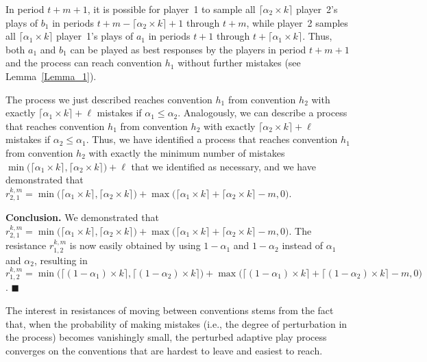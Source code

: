 \documentclass[11.5pt]{article}
\begin{document}
%
In period $t + m + 1%
$, it is possible for player~1 to sample all $\lceil \alpha_2 \times k \rceil$ player~2's plays of $b_1$ in periods $t+m-\lceil \alpha_2 \times k \rceil +1$ through $t + m$, 
while player~2 samples all $\lceil \alpha_1 \times k \rceil$ player~1's plays of $a_1$ in periods $t+1$ through $t+\lceil \alpha_1 \times k \rceil$.
% 
Thus, both $a_1$ and $b_1$ can be played as best responses by the players in period $t + m+1$ and the process can reach convention $h_1$ without further mistakes (see Lemma~\ref{Lemma_1}). 



The  process we just described reaches convention $h_1$ from convention $h_2$ with exactly $\lceil \alpha_1 \times k \rceil +\ell$ mistakes if $\alpha_1\leq \alpha_2$. Analogously, we can describe a process that reaches convention $h_1$ from convention $h_2$ with exactly $\lceil \alpha_2 \times k \rceil +\ell$ mistakes if $\alpha_2\leq \alpha_1$. 
%
Thus, we have identified a process that reaches convention $h_1$ from convention $h_2$ with exactly the minimum number of mistakes $\min\big(\lceil \alpha_1 \times k \rceil,\lceil \alpha_2 \times k \rceil\big) + \ell$ that we identified as necessary, and we have demonstrated that $r_{2,1}^{k,m} = 
\min\big(\lceil \alpha_1 \times k \rceil,\lceil \alpha_2 \times k \rceil\big) + \max\big(\lceil\alpha_1\times k\rceil+\lceil \alpha_2 \times k \rceil-m,0\big)$.

{\bf Conclusion.} We demonstrated that $r^{k,m}_{2,1}=\min\big(\lceil \alpha_1 \times k \rceil,\lceil \alpha_2 \times k \rceil\big)+\max\big(\lceil \alpha_1 \times k \rceil+\lceil \alpha_2 \times k \rceil-m,0\big)$. 
The resistance $r^{k,m}_{1,2}$ is now easily obtained by using $1-\alpha_1$ and $1-\alpha_2$ instead of $\alpha_1$ and $\alpha_2$, resulting in $r^{k,m}_{1,2}=\min\big(\lceil (1-\alpha_1) \times k \rceil,\lceil (1-\alpha_2) \times  k \rceil\big)+\max\big(\lceil (1-\alpha_1) \times k \rceil+\lceil (1-\alpha_2) \times k \rceil-m,0\big)$.
$\blacksquare$

\bigskip
The interest in resistances of moving between conventions stems from the fact that, when the probability of making mistakes (i.e., the degree of perturbation in the process) becomes vanishingly small, the perturbed adaptive play process converges on the conventions that are hardest to leave and easiest to reach. 
%
\end{document}
